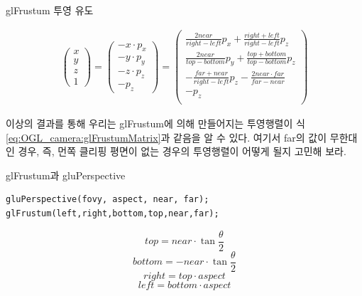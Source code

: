 \documentclass{beamer}
\begin{document}
\begin{frame}[fragile]{glFrustum 투영 유도}

\begin{eqnarray}
\left (
\begin{array}{c}
x\\
y\\
z\\
1
\end{array} 
\right ) =
\left ( 
\begin{array}{c}
-x \cdot p_x\\
-y \cdot p_y\\
-z \cdot p_z\\
-p_z
\end{array} 
\right )=
\left ( 
\begin{array}{cccc}
\frac{2 near}{right - left} p_x + \frac{right+left}{right-left} p_z \\
\frac{2 near}{top - bottom} p_y + \frac{top+bottom}{top-bottom} p_z \\
-\frac{far + near}{right - left} p_z - \frac{2 near \cdot far}{far - near} \\
- p_z \\ \nonumber
\end{array}
\right )
\end{eqnarray}

이상의 결과를 통해 우리는 {\sf glFrustum}에 의해 만들어지는 투영행렬이 
식 \ref{eq:OGL_camera:glFrustumMatrix}과 같음을 알 수 있다.
여기서 {\sf far}의 값이 무한대인 경우, 즉, 먼쪽 클리핑 평면이 없는 경우의 투영행렬이 어떻게 될지 고민해 보라.


\end{frame}

\begin{frame}[fragile]{glFrustum과 gluPerspective}

\begin{verbatim}
gluPerspective(fovy, aspect, near, far);
glFrustum(left,right,bottom,top,near,far);
\end{verbatim}

$$top = near \cdot \tan \frac{\theta}{2}$$
$$bottom = -near \cdot \tan \frac{\theta}{2}$$
$$right = top \cdot aspect$$
$$left = bottom \cdot aspect$$


\end{frame}
\end{document}
